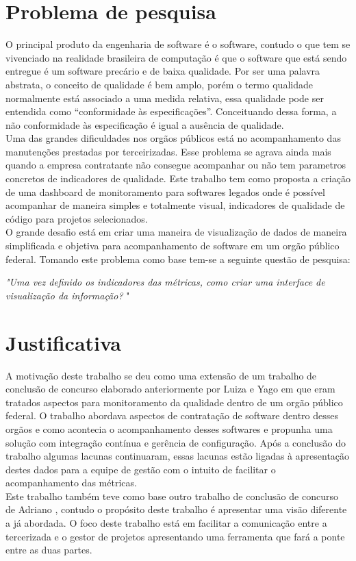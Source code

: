 \section{Problema de pesquisa}
O principal produto da engenharia de software é o software, contudo o que tem se vivenciado na realidade brasileira de computação é que o software que está sendo entregue é um software precário e de baixa qualidade. Por ser uma palavra abstrata, o conceito de qualidade é bem amplo, porém o termo qualidade normalmente está associado a uma medida relativa, essa qualidade pode ser entendida como “conformidade às especificações”. Conceituando dessa forma, a não conformidade às especificação é igual a ausência de qualidade.
	\\Uma das grandes dificuldades nos orgãos públicos está no acompanhamento das manutenções prestadas por terceirizadas. Esse problema se agrava ainda mais quando a empresa contratante não consegue acompanhar ou não tem parametros concretos de indicadores de qualidade. Este trabalho tem como proposta a criação de uma dashboard de monitoramento para softwares legados onde é possível acompanhar de maneira simples e totalmente visual, indicadores de qualidade de código para projetos selecionados.
	\\O grande desafio está em criar uma maneira de visualização de dados de maneira simplificada e objetiva para acompanhamento de software em um orgão público federal. Tomando este problema como base tem-se a seguinte questão de pesquisa:
	
	\begin{center}
	\textit{"Uma vez definido os indicadores das métricas, como criar uma interface de visualização da informação? }"	
	\end{center}

\section{Justificativa}

	A motivação deste trabalho se deu como uma extensão de um trabalho de conclusão de concurso elaborado anteriormente por Luiza e Yago \cite{luiza_yago} em que eram tratados aspectos para monitoramento da qualidade dentro de um orgão público federal. O trabalho abordava aspectos de contratação de software dentro desses orgãos e como acontecia o acompanhamento desses softwares e propunha uma solução com integração contínua e gerência de configuração. Após a conclusão do trabalho algumas lacunas continuaram, essas lacunas estão ligadas à apresentação destes dados para a equipe de gestão com o intuito de facilitar o acompanhamento das métricas.
\\Este trabalho também teve como base outro trabalho de conclusão de concurso de Adriano \cite{silva_painel_2014}, contudo o propósito deste trabalho é apresentar uma visão diferente a já abordada. O foco deste trabalho está em facilitar a comunicação entre a tercerizada e o gestor de projetos apresentando uma ferramenta que fará a ponte entre as duas partes.


